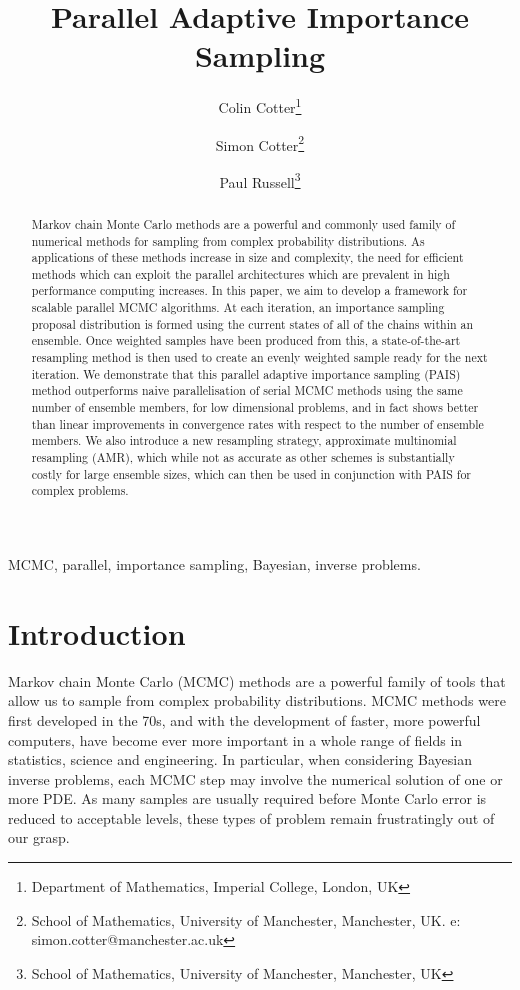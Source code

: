 \documentclass[final]{siamltex}
\author{Colin Cotter\thanks{Department of Mathematics, Imperial
    College, London, UK} \and Simon Cotter\thanks{School of
    Mathematics, University of Manchester, Manchester, UK. e: simon.cotter@manchester.ac.uk} \and Paul Russell\thanks{School of
    Mathematics, University of Manchester, Manchester, UK}}
\title{Parallel Adaptive Importance Sampling}
\begin{document}
\maketitle
\begin{abstract}
  Markov chain Monte Carlo methods are a powerful and commonly used
  family of numerical methods for sampling from complex probability
  distributions. As applications of these methods increase in size and complexity, the need for efficient
  methods which can exploit the parallel architectures which are
  prevalent in high performance computing increases. In this paper, we
  aim to develop a framework for scalable parallel MCMC algorithms. At
  each iteration, an importance sampling proposal distribution is
  formed using the current states of all of the chains within an
  ensemble. Once weighted samples have been produced from this, a
  state-of-the-art resampling method is then used to create an evenly
  weighted sample ready for the next iteration. We demonstrate that
  this parallel adaptive importance sampling (PAIS) method outperforms
  naive parallelisation of serial MCMC methods using the same number
  of ensemble members, for low dimensional problems, and in fact shows
  better than linear improvements in convergence rates with respect to
  the number of ensemble members. We also introduce a new resampling
  strategy, approximate multinomial resampling (AMR), which while not
  as accurate as other schemes is substantially costly for large
  ensemble sizes, which can then be used in conjunction with PAIS for
  complex problems.
\end{abstract}
\begin{keywords}MCMC, parallel, importance sampling, Bayesian, inverse problems.
\end{keywords}
\section{Introduction}
Markov chain Monte Carlo (MCMC) methods are a powerful family of tools
that allow us to sample from complex probability distributions. MCMC
methods were first developed in the 70s\cite{hastings1970monte}, and
with the development of faster, more
powerful computers, have become ever more important in a whole range
of fields in statistics, science and engineering.  In particular, when
considering Bayesian inverse problems, each MCMC step may involve the
numerical solution of one or more PDE. As many samples are usually
required before Monte Carlo error is reduced to acceptable levels,
these types of problem remain frustratingly out of our grasp.
\end{document}
